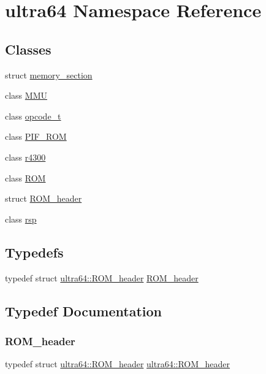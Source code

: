 \hypertarget{namespaceultra64}{}\section{ultra64 Namespace Reference}
\label{namespaceultra64}
\subsection*{Classes}
\begin{DoxyCompactItemize}
\item 
struct \hyperlink{structultra64_1_1memory__section}{memory\+\_\+section}
\item 
class \hyperlink{classultra64_1_1_m_m_u}{M\+MU}
\item 
class \hyperlink{classultra64_1_1opcode__t}{opcode\+\_\+t}
\item 
class \hyperlink{classultra64_1_1_p_i_f___r_o_m}{P\+I\+F\+\_\+\+R\+OM}
\item 
class \hyperlink{classultra64_1_1r4300}{r4300}
\item 
class \hyperlink{classultra64_1_1_r_o_m}{R\+OM}
\item 
struct \hyperlink{structultra64_1_1_r_o_m__header}{R\+O\+M\+\_\+header}
\item 
class \hyperlink{classultra64_1_1rsp}{rsp}
\end{DoxyCompactItemize}
\subsection*{Typedefs}
\begin{DoxyCompactItemize}
\item 
typedef struct \hyperlink{structultra64_1_1_r_o_m__header}{ultra64\+::\+R\+O\+M\+\_\+header} \hyperlink{namespaceultra64_afeb252f8e2e99b09c3bfdfeed67d46e9}{R\+O\+M\+\_\+header}
\end{DoxyCompactItemize}


\subsection{Typedef Documentation}
\mbox{\label{namespaceultra64_afeb252f8e2e99b09c3bfdfeed67d46e9}} 
\subsubsection{\texorpdfstring{R\+O\+M\+\_\+header}{ROM\_header}}
{\footnotesize\ttfamily typedef struct \hyperlink{structultra64_1_1_r_o_m__header}{ultra64\+::\+R\+O\+M\+\_\+header}  \hyperlink{structultra64_1_1_r_o_m__header}{ultra64\+::\+R\+O\+M\+\_\+header}}

